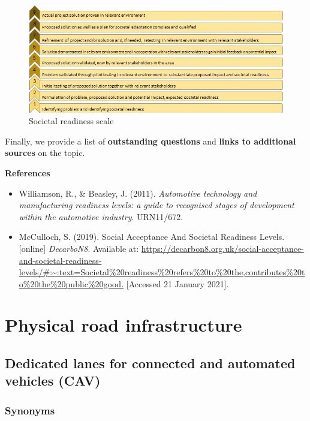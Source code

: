 \documentclass[
]{book}
\providecommand{\tightlist}{%
  \setlength{\itemsep}{0pt}\setlength{\parskip}{0pt}}
\begin{document}
\begin{figure}
\includegraphics[width=0.8\linewidth]{image/SRL_1} \caption{Societal readiness scale}\label{fig:unnamed-chunk-3}
\end{figure}

Finally, we provide a list of \textbf{outstanding questions} and \textbf{links to additional sources} on the topic.

\textbf{References}

\begin{itemize}
\tightlist
\item
  Williamson, R., \& Beasley, J. (2011). \emph{Automotive technology and manufacturing readiness levels: a guide to recognised stages of development within the automotive industry}. URN11/672.
\item
  McCulloch, S. (2019). Social Acceptance And Societal Readiness Levels. {[}online{]} \emph{DecarboN8}. Available at: \url{https://decarbon8.org.uk/social-acceptance-and-societal-readiness-levels/\#:~:text=Societal\%20readiness\%20refers\%20to\%20the,contributes\%20to\%20the\%20public\%20good.} {[}Accessed 21 January 2021{]}.
\end{itemize}

\hypertarget{infrastructure}{%
\chapter{Physical road infrastructure}\label{infrastructure}}

\hypertarget{dedicated-lanes-for-connected-and-automated-vehicles-cav}{%
\section{Dedicated lanes for connected and automated vehicles (CAV)}\label{dedicated-lanes-for-connected-and-automated-vehicles-cav}}

\hypertarget{synonyms}{%
\subsection*{Synonyms}\label{synonyms}}
\end{document}
